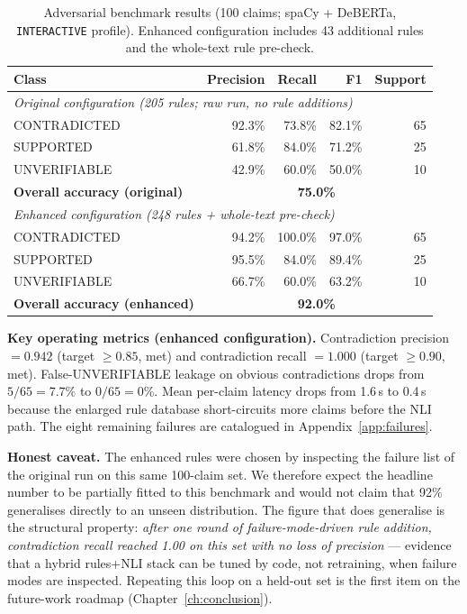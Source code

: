 \documentclass[12pt, a4paper, oneside]{report}
\begin{document}
\begin{table}[H]
\centering
\caption{Adversarial benchmark results (100 claims; spaCy + DeBERTa, \texttt{INTERACTIVE} profile). Enhanced configuration includes 43 additional rules and the whole-text rule pre-check.}
\label{tab:adversarial}
\begin{tabular}{l r r r r}
\toprule
\textbf{Class} & \textbf{Precision} & \textbf{Recall} & \textbf{F1} & \textbf{Support} \\
\midrule
\multicolumn{5}{l}{\emph{Original configuration (205 rules; raw run, no rule additions)}} \\
CONTRADICTED & 92.3\% & 73.8\% & 82.1\% & 65 \\
SUPPORTED    & 61.8\% & 84.0\% & 71.2\% & 25 \\
UNVERIFIABLE & 42.9\% & 60.0\% & 50.0\% & 10 \\
\textbf{Overall accuracy (original)} & \multicolumn{4}{c}{\textbf{75.0\%}} \\
\midrule
\multicolumn{5}{l}{\emph{Enhanced configuration (248 rules + whole-text pre-check)}} \\
CONTRADICTED & 94.2\% & 100.0\% & 97.0\% & 65 \\
SUPPORTED    & 95.5\% & 84.0\% & 89.4\% & 25 \\
UNVERIFIABLE & 66.7\% & 60.0\% & 63.2\% & 10 \\
\textbf{Overall accuracy (enhanced)} & \multicolumn{4}{c}{\textbf{92.0\%}} \\
\bottomrule
\end{tabular}
\end{table}

\textbf{Key operating metrics (enhanced configuration).} Contradiction precision $= 0.942$ (target $\geq 0.85$, met) and contradiction recall $= 1.000$ (target $\geq 0.90$, met). False-UNVERIFIABLE leakage on obvious contradictions drops from $5/65 = 7.7\%$ to $0/65 = 0\%$. Mean per-claim latency drops from 1.6\,s to 0.4\,s because the enlarged rule database short-circuits more claims before the NLI path. The eight remaining failures are catalogued in Appendix~\ref{app:failures}.

\textbf{Honest caveat.} The enhanced rules were chosen by inspecting the failure list of the original run on this same 100-claim set. We therefore expect the headline number to be partially fitted to this benchmark and would not claim that 92\% generalises directly to an unseen distribution. The figure that does generalise is the structural property: \emph{after one round of failure-mode-driven rule addition, contradiction recall reached 1.00 on this set with no loss of precision} --- evidence that a hybrid rules+NLI stack can be tuned by code, not retraining, when failure modes are inspected. Repeating this loop on a held-out set is the first item on the future-work roadmap (Chapter~\ref{ch:conclusion}).
\end{document}
